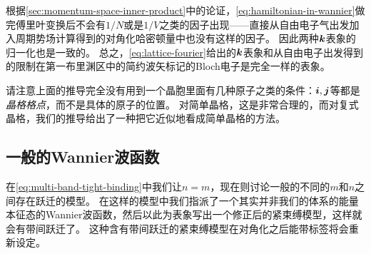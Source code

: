 根据\autoref{sec:momentum-space-inner-product}中的论证，\eqref{eq:hamiltonian-in-wannier}做完傅里叶变换后不会有$1/N$或是$1/V$之类的因子出现——直接从自由电子气出发加入周期势场计算得到的对角化哈密顿量中也没有这样的因子。
因此两种$\vb*{k}$表象的归一化也是一致的。
总之，\eqref{eq:lattice-fourier}给出的$\vb*{k}$表象和从自由电子出发得到的限制在第一布里渊区中的简约波矢标记的Bloch电子是完全一样的表象。

请注意上面的推导完全没有用到一个晶胞里面有几种原子之类的条件：$\vb*{i}, \vb*{j}$等都是\emph{晶格格点}，而不是具体的原子的位置。
对简单晶格，这是非常合理的，而对复式晶格，我们的推导给出了一种把它近似地看成简单晶格的方法。

\subsection{一般的Wannier波函数}

在\eqref{eq:multi-band-tight-binding}中我们让$n=m$，现在则讨论一般的不同的$m$和$n$之间存在跃迁的模型。
在这样的模型中我们指派了一个其实并非我们的体系的能量本征态的Wannier波函数，然后以此为表象写出一个修正后的紧束缚模型，这样就会有带间跃迁了。
这种含有带间跃迁的紧束缚模型在对角化之后能带标签将会重新设定。

